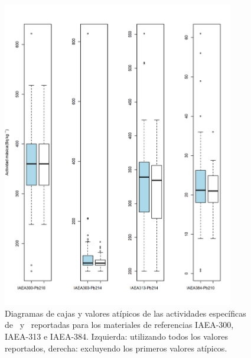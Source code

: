 \begin{figure}
\centering 
\includegraphics[width=0.9\textwidth]{Imagenes/PlotOutliers-1-IAEA-All.png}
\caption{Diagramas de cajas y valores atípicos de las actividades específicas de \PbCero\, y \PbCuatro\, reportadas para los materiales de referencias IAEA-300, IAEA-313 e IAEA-384. Izquierda: utilizando todos los valores reportados, derecha: excluyendo los primeros valores atípicos.  }\label{Fig-OutMRC-1}
\end{figure}
